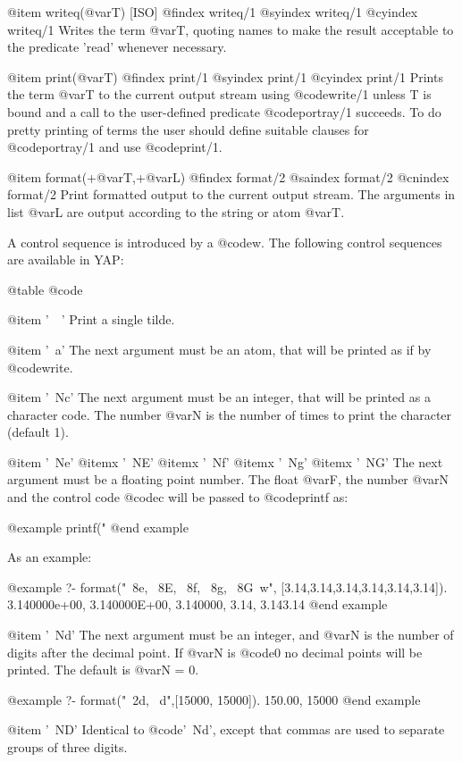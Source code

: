 {{{{{{@item writeq(@var{T}) [ISO]
@findex writeq/1
@syindex writeq/1
@cyindex writeq/1
 Writes the term @var{T}, quoting names to make the result acceptable to
the predicate 'read' whenever necessary.

@item print(@var{T})
@findex print/1
@syindex print/1
@cyindex print/1
Prints the term @var{T} to the current output stream using @code{write/1}
unless T is bound and a call to the user-defined  predicate
@code{portray/1} succeeds. To do pretty  printing of terms the user should
define suitable clauses for @code{portray/1} and use @code{print/1}.

@item format(+@var{T},+@var{L})
@findex format/2
@saindex format/2
@cnindex format/2
Print formatted output to the current output stream. The arguments in
list @var{L} are output according to the string or atom @var{T}.

A control sequence is introduced by a @code{w}. The following control
sequences are available in YAP:

@table @code

@item '~~'
Print a single tilde.

@item '~a'
The next argument must be an atom, that will be printed as if by @code{write}.

@item '~Nc'
The next argument must be an integer, that will be printed as a
character code. The number @var{N} is the number of times to print the
character (default 1).

@item '~Ne'
@itemx '~NE'
@itemx '~Nf'
@itemx '~Ng'
@itemx '~NG'
The next argument must be a floating point number. The float @var{F}, the number
@var{N} and the control code @code{c} will be passed to @code{printf} as:

@example
    printf("%
    @end example

As an example:

@example
?- format("~8e, ~8E, ~8f, ~8g, ~8G~w",
          [3.14,3.14,3.14,3.14,3.14,3.14]).
3.140000e+00, 3.140000E+00, 3.140000, 3.14, 3.143.14
@end example

@item '~Nd'
The next argument must be an integer, and @var{N} is the number of digits
after the decimal point. If @var{N} is @code{0} no decimal points will be
printed. The default is @var{N = 0}.

@example
?- format("~2d, ~d",[15000, 15000]).
150.00, 15000
@end example

@item '~ND'
Identical to @code{'~Nd'}, except that commas are used to separate groups
of three digits.

}}}}}}
